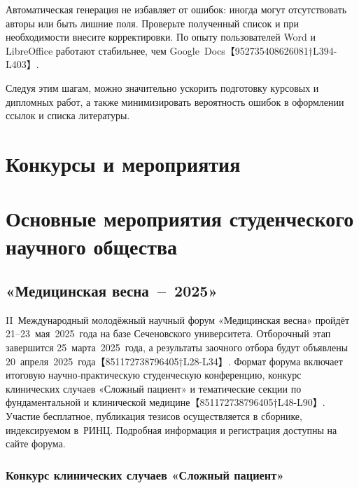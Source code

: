 \documentclass[
  russian,
  12pt,
  a4paper,
]{article}
\begin{document}
Автоматическая генерация не избавляет от ошибок: иногда могут
отсутствовать авторы или быть лишние поля. Проверьте полученный список и
при необходимости внесите корректировки. По опыту пользователей Word и
LibreOffice работают стабильнее, чем
Google~Docs【952735408626081†L394-L403】.

Следуя этим шагам, можно значительно ускорить подготовку курсовых и
дипломных работ, а также минимизировать вероятность ошибок в оформлении
ссылок и списка литературы.

\chapter{Конкурсы и
мероприятия}\label{ux43aux43eux43dux43aux443ux440ux441ux44b-ux438-ux43cux435ux440ux43eux43fux440ux438ux44fux442ux438ux44f}

\chapter{Основные мероприятия студенческого научного
общества}\label{sec-competitions}

\section{«Медицинская
весна~--~2025»}\label{ux43cux435ux434ux438ux446ux438ux43dux441ux43aux430ux44f-ux432ux435ux441ux43dux430-2025}

II~Международный молодёжный научный форум «Медицинская весна» пройдёт
21--23~мая~2025~года на базе Сеченовского университета. Отборочный этап
завершится 25~марта~2025~года, а результаты заочного отбора будут
объявлены 20~апреля~2025~года【851172738796405†L28-L34】. Формат форума
включает итоговую научно‑практическую студенческую конференцию, конкурс
клинических случаев «Сложный пациент» и тематические секции по
фундаментальной и клинической медицине【851172738796405†L48-L90】.
Участие бесплатное, публикация тезисов осуществляется в сборнике,
индексируемом в~РИНЦ. Подробная информация и регистрация доступны на
сайте форума.

\subsection{Конкурс клинических случаев «Сложный
пациент»}\label{ux43aux43eux43dux43aux443ux440ux441-ux43aux43bux438ux43dux438ux447ux435ux441ux43aux438ux445-ux441ux43bux443ux447ux430ux435ux432-ux441ux43bux43eux436ux43dux44bux439-ux43fux430ux446ux438ux435ux43dux442}
\end{document}
